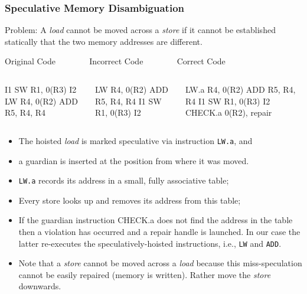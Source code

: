 \documentclass{beamer}
\renewcommand{\emph}[1]{\textcolor{structure}{#1}}
\newcommand{\emp}[1]{\textcolor{DikuRed}{ #1}}
\begin{document}
\begin{frame}[fragile,t]
    \frametitle{Speculative Memory Disambiguation}

\emp{Problem:} A {\em load} cannot be moved across a {\em store} if it cannot be 
established statically that the two memory addresses are different.

\begin{block}{Original Code{\tt~~~~~~~~}Incorrect Code{\tt~~~~~~~~}Correct Code}\vspace{-1ex}
\begin{columns}
\begin{colorcode}[fontsize=\scriptsize]
  I1
  SW  R1, 0(R3)
  I2
  LW  R4, 0(R2)
  ADD R5, R4, R4
\end{colorcode}
\begin{colorcode}[fontsize=\scriptsize]
LW  R4, 0(R2)
ADD R5, R4, R4
I1
SW  R1, 0(R3)
I2
\end{colorcode}
\begin{colorcode}[fontsize=\scriptsize]
\emph{LW.a R4, 0(R2)}
ADD  R5, R4, R4
I1
SW  R1, 0(R3)
I2
\emp{CHECK.a 0(R2), repair}
\end{colorcode}
\end{columns}
\end{block}

\bigskip

\begin{scriptsize}
\begin{itemize}
    \item The hoisted {\em load} is marked speculative via instruction \emph{{\tt LW.a}}, and
    \item a \emp{guardian} is inserted at the position from where it was moved.\smallskip
 
    \item \emph{{\tt LW.a}} records its address in a small, fully associative table;
    \item Every store looks up and removes its address from this table;
    \item If the \emp{guardian} instruction \emp{CHECK.a} does not find the address in
            the table then a violation has occurred and a repair handle is launched. 
          In our case the latter re-executes the speculatively-hoisted instructions,
            i.e., {\tt LW} and {\tt ADD}.  
    \item Note that a {\em store} cannot be moved across a {\em load} because
            this miss-speculation cannot be easily repaired (memory is written). 
          Rather move the {\em store} downwards.
\end  {itemize}
\end{scriptsize}
\end{frame}
\end{document}
